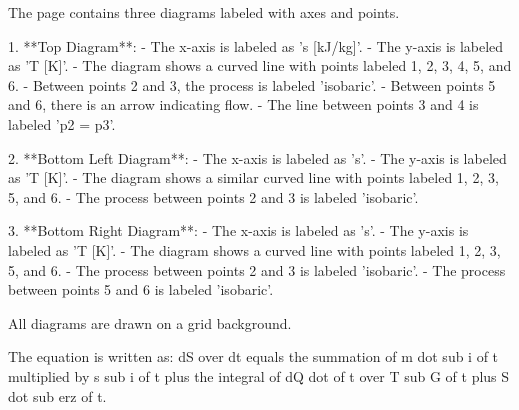 The page contains three diagrams labeled with axes and points.  

1. **Top Diagram**:  
   - The x-axis is labeled as 's [kJ/kg]'.  
   - The y-axis is labeled as 'T [K]'.  
   - The diagram shows a curved line with points labeled 1, 2, 3, 4, 5, and 6.  
   - Between points 2 and 3, the process is labeled 'isobaric'.  
   - Between points 5 and 6, there is an arrow indicating flow.  
   - The line between points 3 and 4 is labeled 'p2 = p3'.  

2. **Bottom Left Diagram**:  
   - The x-axis is labeled as 's'.  
   - The y-axis is labeled as 'T [K]'.  
   - The diagram shows a similar curved line with points labeled 1, 2, 3, 5, and 6.  
   - The process between points 2 and 3 is labeled 'isobaric'.  

3. **Bottom Right Diagram**:  
   - The x-axis is labeled as 's'.  
   - The y-axis is labeled as 'T [K]'.  
   - The diagram shows a curved line with points labeled 1, 2, 3, 5, and 6.  
   - The process between points 2 and 3 is labeled 'isobaric'.  
   - The process between points 5 and 6 is labeled 'isobaric'.  

All diagrams are drawn on a grid background.

The equation is written as:  
dS over dt equals the summation of m dot sub i of t multiplied by s sub i of t plus the integral of dQ dot of t over T sub G of t plus S dot sub erz of t.